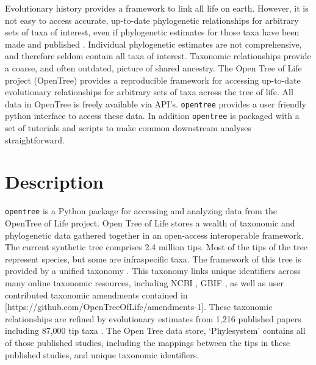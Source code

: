 \documentclass[oupdraft]{sysbio_sse}
\begin{document}
Evolutionary history provides a framework to link all life on earth. However, it is not easy to access accurate, up-to-date phylogenetic relationships for arbitrary sets of taxa of interest, even if phylogenetic estimates for those taxa have been made and published \citep{drew_lost_2013, mctavish_how_2017}. Individual phylogenetic estimates are not comprehensive, and therefore seldom contain all taxa of interest. Taxonomic relationships provide a coarse, and often outdated, picture of shared ancestry. 
The Open Tree of Life project (OpenTree) provides a reproducible framework for accessing up-to-date evolutionary relationships for arbitrary sets of taxa across the tree of life.
All data in OpenTree is freely available via API's.
\texttt{opentree} provides a user friendly python interface to access these data. In addition \texttt{opentree} is packaged with a set of tutorials and scripts to make common downstream analyses straightforward.

\bigskip
\section{Description}
\label{sec2}

\texttt{opentree} is a Python package for accessing and analyzing data from the OpenTree of Life project.
Open Tree of Life stores a wealth of taxonomic and phylogenetic data gathered together in an open-access interoperable framework.
The current synthetic tree \citep{opentreeoflife_open_2019} comprises 2.4 million tips.
Most of the tips of the tree represent species, but some are infraspecific taxa.
The framework of this tree is provided by a unified taxonomy \citep{opentreeoflife_open_2019-1, rees_automated_2017}.
This taxonomy links unique identifiers across many online taxonomic resources, including NCBI \citep{federhen_ncbi_2012}, GBIF \citep{gbif_secretariat_gbif_2019}, as well as user contributed taxonomic amendments contained in [https://github.com/OpenTreeOfLife/amendments-1].
These taxonomic relationships are refined by evolutionary estimates from 1,216 published papers including 87,000 tip taxa \citep{opentreeoflife_open_2019, redelings_supertree_2017}.
The Open Tree data store, `Phylesystem' \citep{mctavish_phylesystem_2015} contains all of those published studies, including the mappings between the tips in these published studies, and unique taxonomic identifiers.
\end{document}
